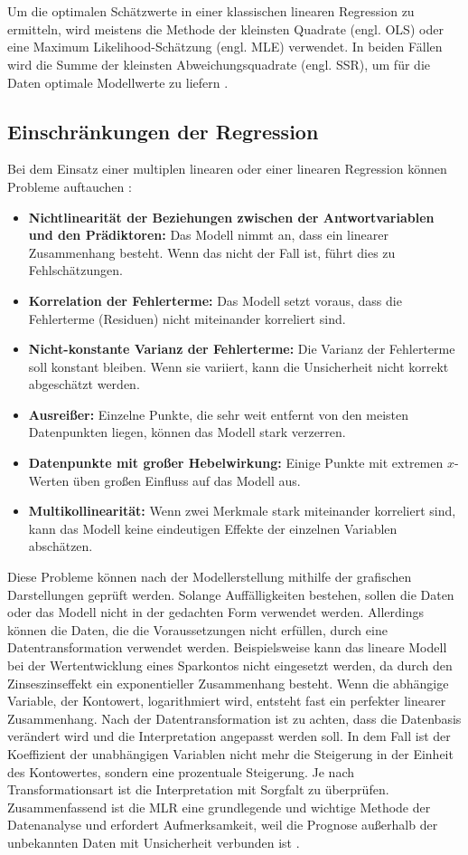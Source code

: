 \\\\
Um die optimalen Schätzwerte in einer klassischen linearen Regression zu ermitteln, wird meistens die Methode der kleinsten Quadrate (engl. \ac{OLS}) oder eine Maximum Likelihood-Schätzung (engl. \ac{MLE}) verwendet. In beiden Fällen wird die Summe der kleinsten Abweichungsquadrate (engl. \ac{SSR}), um für die Daten optimale Modellwerte zu liefern \cite[S. 246]{frick2021data}. 
\subsection{Einschränkungen der Regression}
Bei dem Einsatz einer multiplen linearen oder einer linearen Regression können Probleme auftauchen \cite{james2013introduction}: 
\begin{itemize}
    \item \textbf{Nichtlinearität der Beziehungen zwischen der Antwortvariablen und den Prädiktoren:} Das Modell nimmt an, dass ein linearer Zusammenhang besteht. Wenn das nicht der Fall ist, führt dies zu Fehlschätzungen. 
    \item \textbf{Korrelation der Fehlerterme:} Das Modell setzt voraus, dass die Fehlerterme (Residuen) nicht miteinander korreliert sind.
    \item \textbf{Nicht-konstante Varianz der Fehlerterme:} Die Varianz der Fehlerterme soll konstant bleiben. Wenn sie variiert, kann die Unsicherheit nicht korrekt abgeschätzt werden.
    \item \textbf{Ausreißer:} Einzelne Punkte, die sehr weit entfernt von den meisten Datenpunkten liegen, können das Modell stark verzerren.
    \item \textbf{Datenpunkte mit großer Hebelwirkung:} Einige Punkte mit extremen \(x\)-Werten üben großen Einfluss auf das Modell aus.
    \item \textbf{Multikollinearität:} Wenn zwei Merkmale stark miteinander korreliert sind, kann das Modell keine eindeutigen Effekte der einzelnen Variablen abschätzen.
\end{itemize}
Diese Probleme können nach der Modellerstellung mithilfe der grafischen Darstellungen geprüft werden. Solange Auffälligkeiten bestehen, sollen die Daten oder das Modell nicht in der gedachten Form verwendet werden. Allerdings können die Daten, die die Voraussetzungen nicht erfüllen, durch eine Datentransformation verwendet werden. Beispielsweise kann das lineare Modell bei der Wertentwicklung eines Sparkontos nicht eingesetzt werden, da durch den Zinseszinseffekt ein exponentieller Zusammenhang besteht. Wenn die abhängige Variable, der Kontowert, logarithmiert wird, entsteht fast ein perfekter linearer Zusammenhang. Nach der Datentransformation ist zu achten, dass die Datenbasis verändert wird und die Interpretation angepasst werden soll. In dem Fall ist der Koeffizient der unabhängigen Variablen nicht mehr die Steigerung in der Einheit des Kontowertes, sondern eine prozentuale Steigerung. Je nach Transformationsart ist die Interpretation mit Sorgfalt zu überprüfen. Zusammenfassend ist die \ac{MLR} eine grundlegende und wichtige Methode der Datenanalyse und erfordert Aufmerksamkeit, weil die Prognose außerhalb der unbekannten Daten mit Unsicherheit verbunden ist \cite{akinkunmi2018data}. 

